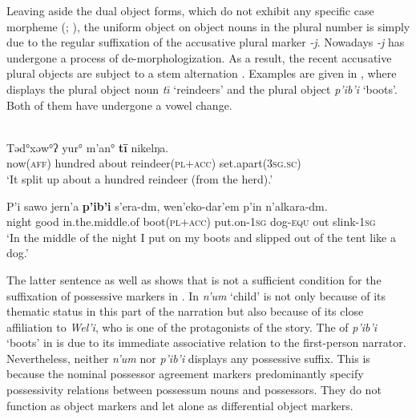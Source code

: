 \documentclass[output=paper]{LSP/langsci}
\begin{document}
Leaving aside the dual object forms, which do not exhibit any specific case morpheme (\citealt[538]{Salminen1998Nenets}; \citealt[57--58]{Nikolaeva2014Grammar}), the uniform object  on  object nouns in the plural number is simply due to the regular suffixation of the accusative plural marker \textit{-j}. Nowadays \textit{-j} has undergone a process of de-morphologization. As a result, the recent  accusative plural objects are subject to a stem alternation \citep[238]{Mikola1988Geschichte}. Examples are given in , where  displays the  plural object noun \textit{t}\textit{\=\i} ‘reindeers’ and  the  plural object \textit{p’ib’i} ‘boots’. Both of them have undergone a vowel change. 

\ea \label{12-wr-ex:12} 
\\

\ea \label{12-wr-ex:12a} 
\gll Tǝd°xǝw°ʔ yur° m’an° \textbf{tī }  nikelŋa.\\
 now(\textsc{aff}) hundred about reindeer\textsc{(pl+acc)} set.apart\textsc{(3sg.sc)}\\
\glt  ‘It split up about a hundred reindeer (from the herd).’ 

\ex\label{12-wr-ex:12b} 
\gll P’i sawo jern’a \textbf{p’ib’i}  s’era-dm, wen’eko-dar’em p’in n’alkara-dm.\\
 night good in.the.middle.of boot\textsc{(pl+acc)} put.on-\textsc{1sg} dog-\textsc{equ} out slink\textsc{-1sg}\\
\glt ‘In the middle of the night I put on my boots and slipped out of the tent like a dog.’
\z
\z

The latter sentence as well as  shows that  is not a sufficient condition for the suffixation of possessive markers in . In  \textit{n’um} ‘child’ is  not only because of its thematic status in this part of the narration but also because of its close affiliation to \textit{Wel’i}, who is one of the protagonists of the story. The  of \textit{p’ib’i} ‘boots’ in  is due to its immediate associative relation to the first-person narrator. Nevertheless, neither \textit{n’um} nor \textit{p’ib’i} displays any possessive suffix. 
This is because the  nominal possessor agreement markers predominantly specify possessivity relations between possessum nouns and possessors. They do not function as object  markers and let alone as differential object markers. 
\end{document}
